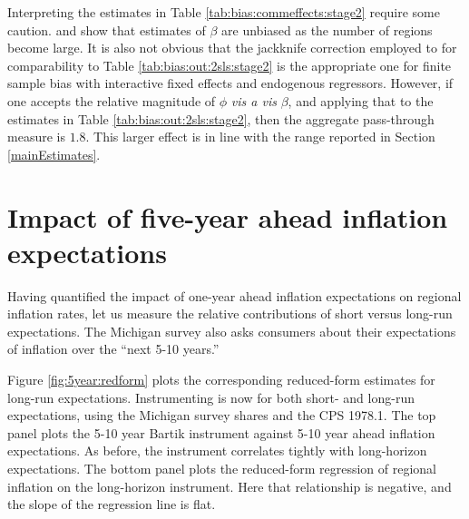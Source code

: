 \documentclass[12pt]{article}
\begin{document}
Interpreting the estimates in Table \ref{tab:bias:commeffects:stage2} require some caution.  \cite{Pesaran:2006} and \cite{HardingLamarche:EL} show that estimates of $\beta$ are unbiased as the number of regions become large.  It is also not obvious that the jackknife correction employed to for comparability to Table \ref{tab:bias:out:2sls:stage2} is the appropriate one for finite sample bias with interactive fixed effects and endogenous regressors.  However, if one accepts the relative magnitude of $\phi$ \emph{vis a vis} $\beta$, and applying that to the estimates in Table \ref{tab:bias:out:2sls:stage2}, then the aggregate pass-through measure is $1.8$.  This larger effect is in line with the range reported in Section \ref{mainEstimates}.



\section{Impact of five-year ahead inflation expectations}


Having quantified the impact of one-year ahead inflation expectations on regional inflation rates, let us measure the relative contributions of short versus long-run expectations. The Michigan survey also asks consumers about their expectations of inflation over the ``next 5-10 years.'' 

Figure \ref{fig:5year:redform} plots the corresponding reduced-form estimates for long-run expectations. Instrumenting is now for both short- and long-run expectations, using the Michigan survey shares and the CPS 1978.1. The top panel plots the 5-10 year Bartik instrument against 5-10 year ahead inflation expectations. As before, the instrument correlates tightly with long-horizon expectations. The bottom panel plots the reduced-form regression of regional inflation on the long-horizon instrument. Here that relationship is negative, and the slope of the regression line is flat.  
\end{document}
